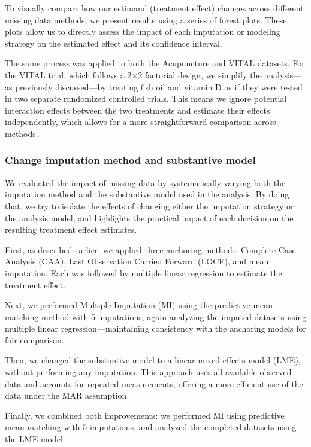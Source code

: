 \documentclass{article}
\begin{document}
To visually compare how our estimand (treatment effect) changes across
different missing data methods, we present results using a series of
forest plots. These plots allow us to directly assess the impact of each
imputation or modeling strategy on the estimated effect and its
confidence interval.

The same process was applied to both the Acupuncture and VITAL datasets.
For the VITAL trial, which follows a 2×2 factorial design, we simplify
the analysis---as previously discussed---by treating fish oil and
vitamin D as if they were tested in two separate randomized controlled
trials. This means we ignore potential interaction effects between the
two treatments and estimate their effects independently, which allows
for a more straightforward comparison across methods.

\subsubsection{Change imputation method and substantive
model}\label{change-imputation-method-and-substantive-model}

We evaluated the impact of missing data by systematically varying both
the imputation method and the substantive model used in the analysis. By
doing that, we try to isolate the effects of changing either the
imputation strategy or the analysis model, and highlights the practical
impact of each decision on the resulting treatment effect estimates.

First, as described earlier, we applied three anchoring methods:
Complete Case Analysis (CAA), Last Observation Carried Forward (LOCF),
and mean imputation. Each was followed by multiple linear regression to
estimate the treatment effect.

Next, we performed Multiple Imputation (MI) using the predictive mean
matching method with 5 imputations, again analyzing the imputed datasets
using multiple linear regression---maintaining consistency with the
anchoring models for fair comparison.

Then, we changed the substantive model to a linear mixed-effects model
(LME), without performing any imputation. This approach uses all
available observed data and accounts for repeated measurements, offering
a more efficient use of the data under the MAR assumption.

Finally, we combined both improvements: we performed MI using predictive
mean matching with 5 imputations, and analyzed the completed datasets
using the LME model.
\end{document}
